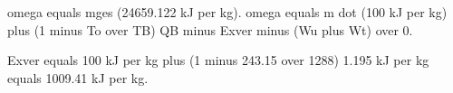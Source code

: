 omega equals mges (24659.122 kJ per kg). omega equals m dot (100 kJ per kg) plus (1 minus To over TB) QB minus Exver minus (Wu plus Wt) over 0.

Exver equals 100 kJ per kg plus (1 minus 243.15 over 1288) 1.195 kJ per kg equals 1009.41 kJ per kg.